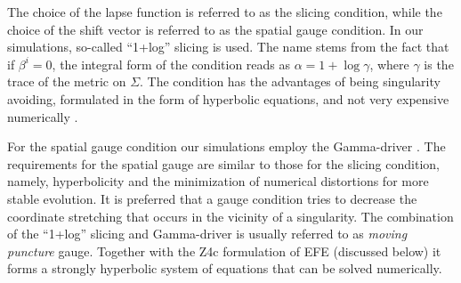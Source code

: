 %
The choice of the lapse function is referred to as the slicing condition, 
while the choice of the shift vector is referred to as the spatial gauge condition. 
In our simulations, so-called ``1+log'' slicing is used. %
%
The name stems from the fact that if $\beta^i = 0$, 
the integral form of the condition reads as $\alpha = 1 + \log \gamma$, 
where $\gamma$ is the trace of the metric on $\Sigma$.
%
The condition has the advantages of being singularity avoiding, formulated in the form of hyperbolic equations, and not very expensive numerically  \citep{Alcubierre:2002kk}.


For the spatial gauge condition our simulations employ the Gamma-driver 
\citep{Alcubierre:2002kk,vanMeter:2006vi}.
The requirements for the spatial gauge are similar to those for 
the slicing condition, 
namely, hyperbolicity and the minimization of numerical distortions for more stable evolution. 
It is preferred that a gauge condition tries to decrease the coordinate stretching that occurs in the 
vicinity of a singularity. 
%
The combination of the ``1+log'' slicing and Gamma-driver 
is usually referred to as \textit{moving puncture} gauge.
Together with the Z4c formulation of \ac{EFE} (discussed below) 
it forms a strongly hyperbolic system of equations that can be solved numerically.
%


